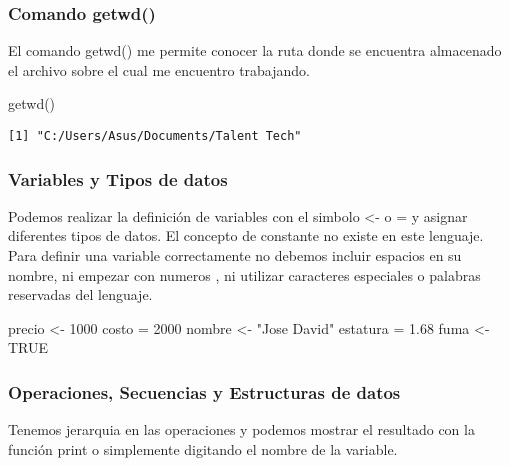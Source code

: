 \documentclass[
  letterpaper,
  DIV=11,
  numbers=noendperiod]{scrartcl}
\newenvironment{Shaded}{\begin{snugshade}}{\end{snugshade}}
\newcommand{\ConstantTok}[1]{\textcolor[rgb]{0.56,0.35,0.01}{#1}}
\newcommand{\DecValTok}[1]{\textcolor[rgb]{0.68,0.00,0.00}{#1}}
\newcommand{\FloatTok}[1]{\textcolor[rgb]{0.68,0.00,0.00}{#1}}
\newcommand{\FunctionTok}[1]{\textcolor[rgb]{0.28,0.35,0.67}{#1}}
\newcommand{\NormalTok}[1]{\textcolor[rgb]{0.00,0.23,0.31}{#1}}
\newcommand{\OtherTok}[1]{\textcolor[rgb]{0.00,0.23,0.31}{#1}}
\newcommand{\StringTok}[1]{\textcolor[rgb]{0.13,0.47,0.30}{#1}}
\begin{document}
\subsubsection{Comando getwd()}\label{comando-getwd}

El comando getwd() me permite conocer la ruta donde se encuentra
almacenado el archivo sobre el cual me encuentro trabajando.

\begin{Shaded}
\begin{Highlighting}[]
\FunctionTok{getwd}\NormalTok{()}
\end{Highlighting}
\end{Shaded}

\begin{verbatim}
[1] "C:/Users/Asus/Documents/Talent Tech"
\end{verbatim}

\subsubsection{Variables y Tipos de
datos}\label{variables-y-tipos-de-datos}

Podemos realizar la definición de variables con el simbolo \textless- o
= y asignar diferentes tipos de datos. El concepto de constante no
existe en este lenguaje. Para definir una variable correctamente no
debemos incluir espacios en su nombre, ni empezar con numeros , ni
utilizar caracteres especiales o palabras reservadas del lenguaje.

\begin{Shaded}
\begin{Highlighting}[]
\NormalTok{precio }\OtherTok{\textless{}{-}} \DecValTok{1000}
\NormalTok{costo }\OtherTok{=} \DecValTok{2000}
\NormalTok{nombre }\OtherTok{\textless{}{-}} \StringTok{"Jose David"}
\NormalTok{estatura }\OtherTok{=} \FloatTok{1.68}
\NormalTok{fuma }\OtherTok{\textless{}{-}} \ConstantTok{TRUE}
\end{Highlighting}
\end{Shaded}

\subsubsection{Operaciones, Secuencias y Estructuras de
datos}\label{operaciones-secuencias-y-estructuras-de-datos}

Tenemos jerarquia en las operaciones y podemos mostrar el resultado con
la función print o simplemente digitando el nombre de la variable.
\end{document}
